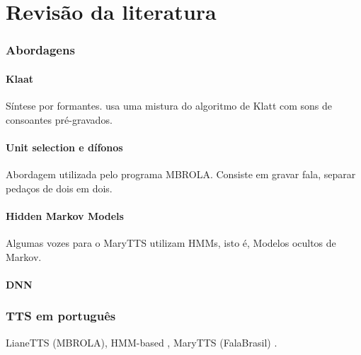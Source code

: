 

\chapter{Revisão da literatura}



\subsection{Abordagens}
\subsubsection{Klaat}
Síntese por formantes. \cite{espeakng} usa uma mistura do algoritmo de Klatt com
sons de consoantes pré-gravados.
\subsubsection{Unit selection e dífonos}
Abordagem utilizada pelo programa MBROLA. Consiste em gravar fala, separar
pedaços de dois em dois.
\subsubsection{Hidden Markov Models}
Algumas vozes para o MaryTTS \cite{marytts} utilizam HMMs, isto é, Modelos ocultos de Markov.
\subsubsection{DNN}

\subsection{TTS em português}
LianeTTS (MBROLA), HMM-based \cite{couto}, MaryTTS (FalaBrasil) \cite{falabrasil}.
